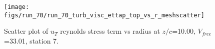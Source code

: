 \begin{figure}[H]
\centering
\texttt{[image: figs/run\_70/run\_70\_turb\_visc\_ettap\_top\_vs\_r\_meshscatter]}
\caption{Scatter plot of $
u_T$ reynolds stress term vs radius at $z/c$=10.00, $V_{free}$=33.01, station 7.}
\end{figure}


